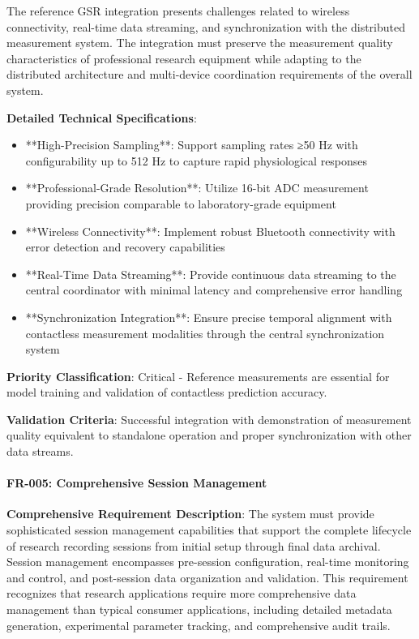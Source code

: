 \documentclass[11pt,a4paper]{report}
\begin{document}
The reference GSR integration presents challenges related to wireless connectivity, real-time data streaming, and
synchronization with the distributed measurement system. The integration must preserve the measurement quality
characteristics of professional research equipment while adapting to the distributed architecture and multi-device
coordination requirements of the overall system.

\textbf{Detailed Technical Specifications}:

\begin{itemize}
\item **High-Precision Sampling**: Support sampling rates ≥50 Hz with configurability up to 512 Hz to capture rapid
  physiological responses
\item **Professional-Grade Resolution**: Utilize 16-bit ADC measurement providing precision comparable to laboratory-grade
  equipment
\item **Wireless Connectivity**: Implement robust Bluetooth connectivity with error detection and recovery capabilities
\item **Real-Time Data Streaming**: Provide continuous data streaming to the central coordinator with minimal latency and
  comprehensive error handling
\item **Synchronization Integration**: Ensure precise temporal alignment with contactless measurement modalities through the
  central synchronization system

\end{itemize}
\textbf{Priority Classification}: Critical - Reference measurements are essential for model training and validation of
contactless prediction accuracy.

\textbf{Validation Criteria}: Successful integration with demonstration of measurement quality equivalent to standalone
operation and proper synchronization with other data streams.

\paragraph{FR-005: Comprehensive Session Management}

\textbf{Comprehensive Requirement Description}: The system must provide sophisticated session management capabilities that
support the complete lifecycle of research recording sessions from initial setup through final data archival. Session
management encompasses pre-session configuration, real-time monitoring and control, and post-session data organization
and validation. This requirement recognizes that research applications require more comprehensive data management than
typical consumer applications, including detailed metadata generation, experimental parameter tracking, and
comprehensive audit trails.
\end{document}
